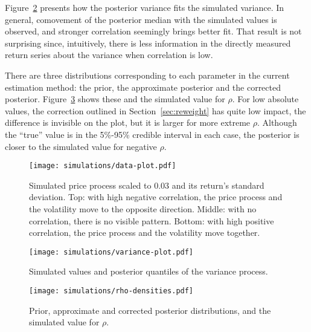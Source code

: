 Figure~\ref{fig:volatility} presents how the posterior variance fits the simulated variance.
In general, comovement of the posterior median with the simulated values is observed, and stronger correlation seemingly brings better fit.
That result is not surprising since, intuitively, there is less information in the directly measured return series about the variance when correlation is low.

There are three distributions corresponding to each parameter in the current estimation method: the prior, the approximate posterior and the corrected posterior.
Figure~\ref{fig:rhodensities} shows these and the simulated value for $\rho$.
For low absolute values, the correction outlined in Section~\ref{sec:reweight} has quite low impact, the difference is invisible on the plot, but it is larger for more extreme $\rho$.
Although the ``true'' value is in the 5\%-95\% credible interval in each case, the posterior is closer to the simulated value for negative $\rho$.

\begin{figure}
	\centering
	\texttt{[image: simulations/data-plot.pdf]}
	\caption[Simulated price process and standard deviation]{Simulated price process scaled to 0.03 and its return's standard deviation.
		Top: with high negative correlation, the price process and the volatility move to the opposite direction.
		Middle: with no correlation, there is no visible pattern.
		Bottom: with high positive correlation, the price process and the volatility move together.}
	\label{fig:simdata}
\end{figure}

\begin{figure}
	\centering
	\texttt{[image: simulations/variance-plot.pdf]}
	\caption{Simulated values and posterior quantiles of the variance process.}
	\label{fig:volatility}
\end{figure}

\begin{figure}
	\centering
	\texttt{[image: simulations/rho-densities.pdf]}
	\caption[Prior, approximate and true posteriors, and simulated $\rho$]{Prior, approximate and corrected posterior distributions, and the simulated value for $\rho$.}
	\label{fig:rhodensities}
\end{figure}
